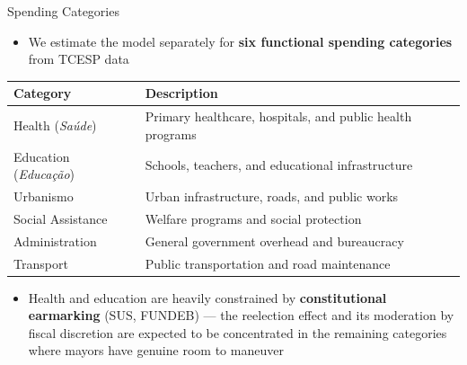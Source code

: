 \documentclass{beamer}
\begin{document}
\begin{frame}{Spending Categories}
\begin{itemize}
    \item We estimate the model separately for \textbf{six functional spending categories} from TCESP data
\end{itemize}
\vspace{0.5em}
\begin{table}
\centering
\small
\begin{tabular}{lp{7cm}}
\toprule
\textbf{Category} & \textbf{Description} \\
\midrule
Health (\textit{Saúde}) & Primary healthcare, hospitals, and public health programs \\
Education (\textit{Educação}) & Schools, teachers, and educational infrastructure \\
Urbanismo & Urban infrastructure, roads, and public works \\
Social Assistance & Welfare programs and social protection \\
Administration & General government overhead and bureaucracy \\
Transport & Public transportation and road maintenance \\
\bottomrule
\end{tabular}
\end{table}
\vspace{0.5em}
\begin{itemize}
    \item Health and education are heavily constrained by \textbf{constitutional earmarking} (SUS, FUNDEB) --- the reelection effect and its moderation by fiscal discretion are expected to be concentrated in the remaining categories where mayors have genuine room to maneuver
\end{itemize}
\end{frame}
\end{document}

